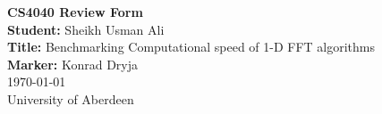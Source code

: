 \documentclass{article}
\begin{document}
	\begin{center}
    
    
		\LARGE{\textbf{CS4040 Review Form}} \\
        \vspace{1em}
        \normalsize\textbf{Student:} Sheikh Usman Ali\\
        \normalsize\textbf{Title:} Benchmarking Computational speed of 1-D FFT algorithms\\
        \vspace{1em}
        \normalsize\textbf{Marker:} Konrad Dryja\\
        \vspace{1em}
        \today \\
        \normalsize{University of Aberdeen} \
     
	\end{center}
\end{document}
